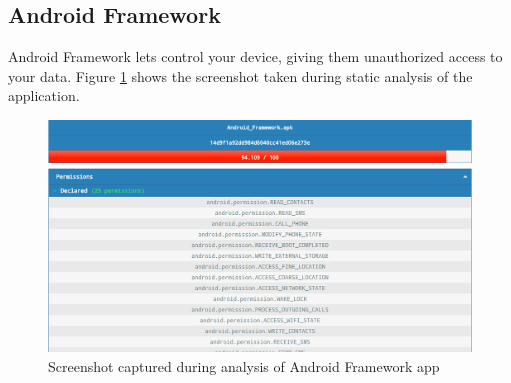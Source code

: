 \subsection{Android Framework}
Android Framework lets control your device, giving them unauthorized access to your data. Figure \ref{fig:andro} shows the screenshot taken during static analysis of the application.
\begin{figure}[!h]
  \centering
  \includegraphics [scale=0.5] {andro.png}
  \caption{Screenshot captured during analysis of Android Framework app}
  \label{fig:andro}
\end{figure}
